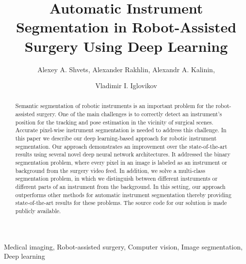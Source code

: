 \documentclass[runningheads,a4paper]{llncs}[2015/06/24]
\begin{document}
\title{Automatic Instrument Segmentation in Robot-Assisted Surgery Using Deep Learning}



\author{Alexey A. Shvets, Alexander Rakhlin, Alexandr A. Kalinin, \\ \and Vladimir I. Iglovikov}


\maketitle

\begin{abstract}
Semantic segmentation of robotic instruments is an important problem for the robot-assisted surgery. One of the main challenges is to correctly detect an instrument's position for the tracking and pose estimation in the vicinity of surgical scenes. Accurate pixel-wise instrument segmentation is needed to address this challenge. In this paper we describe our deep learning-based approach for robotic instrument segmentation. Our approach demonstrates an improvement over the state-of-the-art results using several novel deep neural network architectures. It addressed the binary segmentation problem, where every pixel in an image is labeled as an instrument or background from the surgery video feed. In addition, we solve a multi-class segmentation problem, in which we distinguish between different instruments or different parts of an instrument from the background. In this setting, our approach outperforms other methods for automatic instrument segmentation thereby providing state-of-the-art results for these problems.
The source code for our solution is made publicly available.
\end{abstract}

\begin{keywords}
Medical imaging, Robot-assisted surgery, Computer vision, Image segmentation, Deep learning
\end{keywords}
\end{document}
